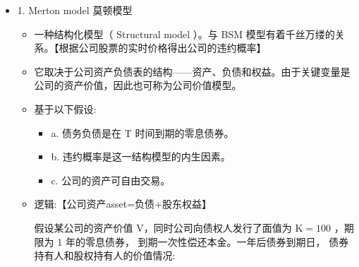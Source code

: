 \begin{itemize}
\item 1. Merton model 莫顿模型

\begin{itemize}
\item 一种结构化模型（ Structural model ）。与 BSM 模型有着千丝万缕的关系。【根据公司股票的实时价格得出公司的违约概率】

\item 它取决于公司资产负债表的结构——资产、负债和权益。由于关键变量是公司的资产价值，因此也可称为公司价值模型。

\item 基于以下假设: 
\begin{itemize}

    \item a. 债务负债是在 T 时间到期的零息债券。

    \item b. 违约概率是这一结构模型的内生因素。

    \item c. 公司的资产可自由交易。
\end{itemize}

\item 逻辑:【公司资产asset=负债+股东权益】

 假设某公司的资产价值 V，同时公司向债权人发行了面值为 \(\mathrm{K} = {100}\) ，期限为 1 年的零息债券， 到期一次性偿还本金。一年后债券到期日， 债券持有人和股权持有人的价值情况:

\begin{center}
\end{center}


\end{itemize}
\end{itemize}
